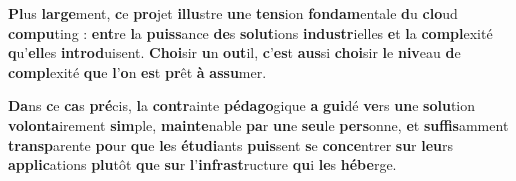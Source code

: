 \documentclass{rapportClass} %
\begin{document}
\textbf{Pl}us \textbf{large}ment, \textbf{c}e \textbf{pro}jet \textbf{illu}stre \textbf{un}e \textbf{tens}ion \textbf{fondam}entale \textbf{d}u \textbf{clo}ud
\textbf{compu}ting : \textbf{ent}re \textbf{l}a \textbf{puiss}ance \textbf{de}s \textbf{solut}ions \textbf{industr}ielles \textbf{e}t \textbf{l}a
\textbf{compl}exité \textbf{q}u'\textbf{ell}es \textbf{introd}uisent. \textbf{Choi}sir \textbf{u}n \textbf{out}il, \textbf{c}'\textbf{es}t \textbf{aus}si
\textbf{choi}sir \textbf{l}e \textbf{niv}eau \textbf{d}e \textbf{compl}exité \textbf{qu}e \textbf{l}'\textbf{o}n \textbf{es}t \textbf{pr}êt \textbf{à} \textbf{assu}mer.

\textbf{Da}ns \textbf{c}e \textbf{ca}s \textbf{pré}cis, \textbf{l}a \textbf{contr}ainte \textbf{pédago}gique \textbf{a} \textbf{gui}dé \textbf{ve}rs \textbf{un}e
\textbf{solu}tion \textbf{volonta}irement \textbf{sim}ple, \textbf{mainte}nable \textbf{pa}r \textbf{un}e \textbf{seu}le \textbf{pers}onne,
\textbf{e}t \textbf{suffis}amment \textbf{transp}arente \textbf{po}ur \textbf{qu}e \textbf{le}s \textbf{étudi}ants \textbf{puis}sent \textbf{s}e
\textbf{conce}ntrer \textbf{su}r \textbf{leu}rs \textbf{applic}ations \textbf{plu}tôt \textbf{qu}e \textbf{su}r \textbf{l}'\textbf{infrast}ructure
\textbf{qu}i \textbf{le}s \textbf{hébe}rge.




\end{document}
